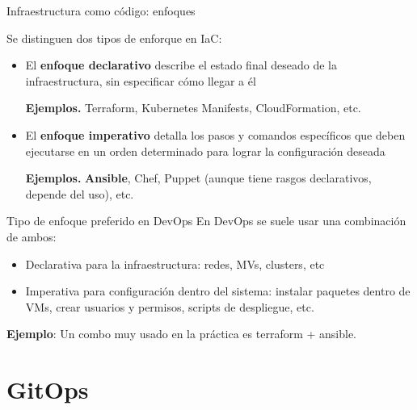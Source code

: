 \documentclass{beamer}
\begin{document}
\begin{frame}{Infraestructura como código: enfoques}

Se distinguen dos tipos de enforque en IaC:

\begin{itemize}
    \item El \textbf{enfoque declarativo} describe el estado final deseado de la infraestructura, sin especificar cómo llegar a él

    \textbf{Ejemplos.} Terraform, Kubernetes Manifests, CloudFormation, etc.

    \pause
    
    
    \item El \textbf{enfoque imperativo} detalla los pasos y comandos específicos que deben ejecutarse en un orden determinado para lograr la configuración deseada

     \textbf{Ejemplos.} \textbf{Ansible}, Chef, Puppet (aunque tiene rasgos declarativos, depende del uso), etc.
\end{itemize}

\pause

\begin{block}{Tipo de enfoque preferido en DevOps}
En DevOps se suele usar una combinación de ambos:

\begin{itemize}
    \item Declarativa para la infraestructura: redes, MVs, clusters, etc
    \item Imperativa para configuración dentro del sistema: instalar paquetes dentro de VMs, crear usuarios y permisos, scripts de despliegue, etc.
\end{itemize}

\textbf{Ejemplo}: Un combo muy usado en la práctica es terraform + ansible.
\end{block}

\end{frame}

\section{GitOps}
\end{document}
